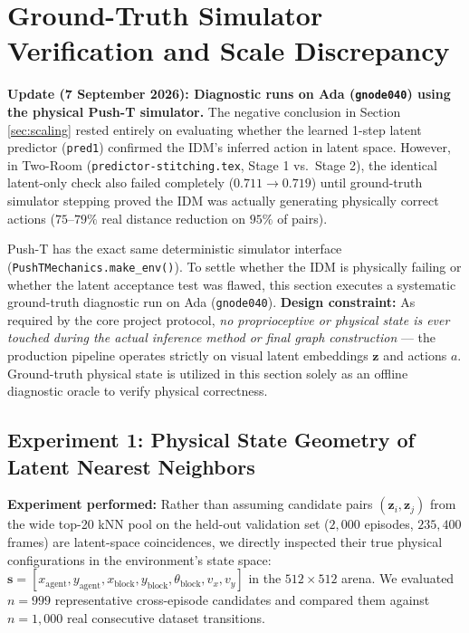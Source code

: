 \documentclass[11pt]{article}
\newcommand{\zv}{\mathbf{z}}
\begin{document}
\section{Ground-Truth Simulator Verification and Scale Discrepancy}
\label{sec:groundtruth}

\textbf{Update (7 September 2026): Diagnostic runs on Ada (\texttt{gnode040}) using the physical Push-T simulator.}
The negative conclusion in Section \ref{sec:scaling} rested entirely on evaluating whether the learned
1-step latent predictor (\texttt{pred1}) confirmed the IDM's inferred action in latent space.
However, in Two-Room (\texttt{predictor-stitching.tex}, Stage 1 vs.\ Stage 2), the identical latent-only
check also failed completely ($0.711 \to 0.719$) until ground-truth simulator stepping proved the IDM was
actually generating physically correct actions ($75$--$79\%$ real distance reduction on $95\%$ of pairs).

Push-T has the exact same deterministic simulator interface (\texttt{PushTMechanics.make\_env()}). To
settle whether the IDM is physically failing or whether the latent acceptance test was flawed, this
section executes a systematic ground-truth diagnostic run on Ada (\texttt{gnode040}).
\textbf{Design constraint:} As required by the core project protocol, \emph{no proprioceptive or physical
state is ever touched during the actual inference method or final graph construction} --- the production
pipeline operates strictly on visual latent embeddings $\zv$ and actions $a$. Ground-truth physical
state is utilized in this section solely as an offline diagnostic oracle to verify physical correctness.

\subsection{Experiment 1: Physical State Geometry of Latent Nearest Neighbors}
\label{sec:exp1-geometry}

\textbf{Experiment performed:} Rather than assuming candidate pairs $(\zv_i, \zv_j)$ from the wide top-20
kNN pool on the held-out validation set ($2{,}000$ episodes, $235{,}400$ frames) are latent-space coincidences,
we directly inspected their true physical configurations in the environment's state space:
$\mathbf{s} = [x_{\mathrm{agent}}, y_{\mathrm{agent}}, x_{\mathrm{block}}, y_{\mathrm{block}}, \theta_{\mathrm{block}}, v_x, v_y]$
in the $512\times 512$ arena. We evaluated $n=999$ representative cross-episode candidates and compared them
against $n=1{,}000$ real consecutive dataset transitions.
\end{document}
